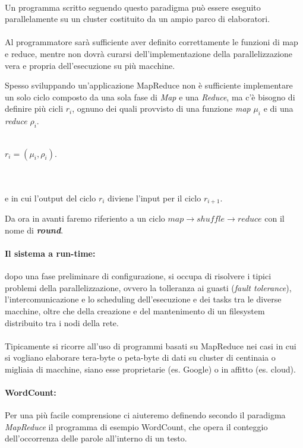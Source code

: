 \documentclass[a4paper,11pt]{report}
\begin{document}
\paragraph{} 
Un programma scritto seguendo questo paradigma può essere eseguito parallelamente su un
cluster costituito da un ampio parco di elaboratori. 
\paragraph{}
Al programmatore sarà sufficiente aver definito correttamente le funzioni di map e reduce,
mentre non dovrà curarsi dell'implementazione della parallelizzazione vera e propria dell'esecuzione su più macchine.
\par
Spesso sviluppando un'applicazione MapReduce non è sufficiente implementare un solo ciclo composto da una sola fase di \emph{Map} e una
\emph{Reduce}, ma c'è bisogno di 
definire più cicli \textit{\textbf{$r_i$}}, ognuno dei quali provvisto di una funzione \emph{map} \textit{\textbf{$\mu_i$}} e di una
\emph{reduce} \textit{\textbf{$\rho_i$}}.\\\\
\centerline{$r_i = (\mu_i, \rho_i).$}\\\\
e in cui l'output del ciclo $r_i$ diviene l'input per il ciclo $r_{i+1}$.
\par Da ora in avanti faremo riferiento a un ciclo $map \rightarrow shuffle \rightarrow reduce$ con il nome di \emph{\textbf{round}}.
\paragraph{Il sistema a run-time:} dopo una fase preliminare di configurazione, si occupa di risolvere i tipici problemi della
parallelizzazione, ovvero la tolleranza ai guasti
(\emph{fault tolerance}), l'intercomunicazione e lo scheduling dell'esecuzione e dei tasks tra le diverse macchine, oltre che della
creazione e del mantenimento di un 
filesystem distribuito tra i nodi della rete.
\paragraph{}
Tipicamente si ricorre all'uso di programmi basati su MapReduce nei casi in cui si vogliano elaborare tera-byte o peta-byte di dati su
cluster di centinaia o migliaia
di macchine, siano esse proprietarie (es. Google) o in affitto (es. cloud).
\paragraph{WordCount:}Per una più facile comprensione ci aiuteremo definendo secondo il paradigma \emph{MapReduce} il programma di esempio
WordCount, che opera il conteggio 
dell'occorrenza delle parole all'interno di un testo.
\end{document}
